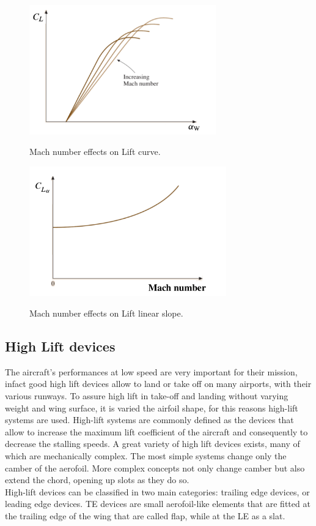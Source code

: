\begin{figure}[H]
\centering
{\includegraphics[height=5.6cm]{Immagini/clamach}} 
\caption{Mach number effects on Lift curve.}
\label{fig:clalfawing}
\end{figure}

\begin{figure}[H]
\centering
{\includegraphics[height=5.6cm]{Immagini/declmach.png}} 
\caption{Mach number effects on Lift linear slope.}
\label{fig:clalfawingslope}
\end{figure}

\subsection{High Lift devices}
The aircraft’s performances at low speed are very important for their mission, infact good high lift devices allow to land or take off on many airports, with their various runways.\cite{adas}
To assure high lift in take-off and landing without varying weight and wing surface, it is varied the airfoil shape, for this reasons high-lift systems are used. High-lift systems are commonly defined as the devices that allow to increase the maximum lift coefficient of the aircraft and consequently to decrease the stalling speeds. 
A great variety of high lift devices exists, many of which are mechanically complex. The most simple systems change only the camber of the aerofoil. More complex concepts not only change camber but also extend the chord, opening up slots as they do so. \cite{howe2000aircraft}\\
High-lift devices can be classified in two main categories: trailing edge devices, or leading edge devices.
TE devices are small aerofoil-like elements that are fitted at the trailing edge of the wing that are called flap, while  at the LE as a slat.


